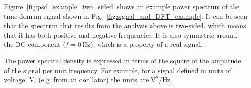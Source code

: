 Figure~\ref{fig:psd_example_two_sided} shows an example power spectrum of the time-domain signal shown in Fig.~\ref{fig:signal_and_DFT_example}. It can be seen that the spectrum that results from the analysis above is two-sided, which means that it has both positive and negative frequencies. It is also symmetric around the DC component ($f = $0\,Hz), which is a property of a real signal. 

The power spectral density is expressed in terms of the square of the amplitude of the signal per unit frequency. For example, for a signal defined in units of voltage, V, (e.g. from an oscillator) the units are $\mathrm{V^2/Hz}$.




